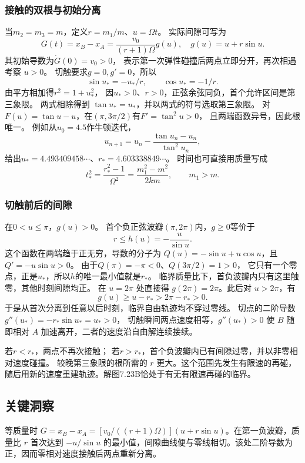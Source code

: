 \documentclass[UTF8,fontset=fandol,a4paper,11pt]{ctexart}
\begin{document}
\subsubsection*{接触的双根与初始分离}
当$m_2=m_3=m$，定义$r=m_1/m$、$u=\Omega t$。
实际间隙可写为
\[
G(t)=x_B-x_A=\frac{v_0}{(r+1)\Omega}g(u),
\quad g(u)=u+r\sin u.
\]
其初始导数为$\dot G(0)=v_0>0$，
表示第一次弹性碰撞后两点立即分开，再次相遇考察 $u>0$。
切触要求$g=0,g'=0$，所以
\[
\sin u_*=-u_*/r,\qquad\cos u_*=-1/r.
\]
由平方相加得$r^2=1+u_*^2$，
因$u_*>0$、$r>0$，正弦余弦同负，首个允许区间是第三象限。
两式相除得到 $\tan u_*=u_*$，并以两式的符号选取第三象限。
对$F(u)=\tan u-u$，在$(\pi,3\pi/2)$有$F'=\tan^2u>0$，
且两端函数异号，因此根唯一。
例如从$u_0=4.5$作牛顿迭代，
\[
u_{n+1}=u_n-\frac{\tan u_n-u_n}{\tan^2u_n},
\]
给出$u_*=4.493409458\cdots$、$r_*=4.603338849\cdots$。
时间也可直接用质量写成
\[
t_*^2=\frac{r_*^2-1}{\Omega^2}
=\frac{m_1^2-m^2}{2km},\qquad m_1>m.
\]

\subsubsection*{切触前后的间隙}
在$0<u\le\pi$，$g(u)>0$。
首个负正弦波瓣$(\pi,2\pi)$内，$g\ge0$等价于
\[
r\le h(u)=-\frac u{\sin u}.
\]
这个函数在两端趋于正无穷，导数的分子为
$Q(u)=-\sin u+u\cos u$，且$Q'=-u\sin u>0$。
由于$Q(\pi)=-\pi<0$、$Q(3\pi/2)=1>0$，
它只有一个零点，正是$u_*$，所以$h$的唯一最小值就是$r_*$。
临界质量比下，首负波瓣内只有这里触零，其他时刻间隙均正。
在 $u=2\pi$ 处直接得 $g(2\pi)=2\pi$。此后对 $u>2\pi$，有
\[
g(u)\ge u-r_*>2\pi-r_*>0.
\]
于是从首次分离到任意以后时刻，临界自由轨迹均不穿过零线。
切点的二阶导数$g''(u_*)=-r_*\sin u_*=u_*>0$，
切触瞬间两点速度相等，$g''(u_*)>0$ 使 $B$ 随即相对 $A$ 加速离开，二者的速度沿自由解连续接续。

若$r<r_*$，两点不再次接触；
若$r>r_*$，首个负波瓣内已有间隙过零，并以非零相对速度碰撞。
较晚第三象限的根所需的 $r$ 更大。这个范围先发生有限速的再碰，随后用新的速度重建轨迹。解图7.23B恰处于有无有限速再碰的临界。




\subsection*{关键洞察}

等质量时 $G=x_B-x_A=[v_0/((r+1)\Omega)](u+r\sin u)$。在第一负波瓣，质量比 $r$ 首次达到 $-u/\sin u$ 的最小值，间隙曲线便与零线相切。该处二阶导数为正，因而零相对速度接触后两点重新分离。
\end{document}

